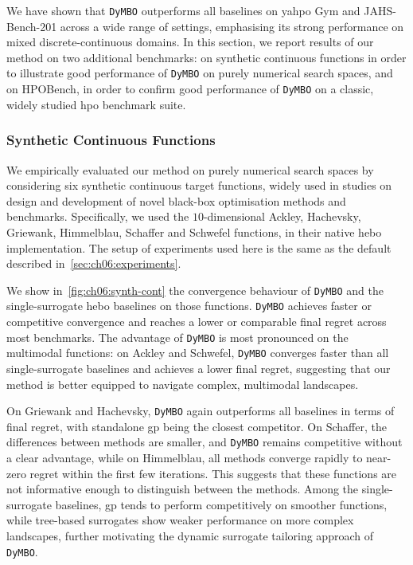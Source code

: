 We have shown that \texttt{DyMBO} outperforms all baselines on \gls{yahpo} Gym and JAHS-Bench-201 across a wide range of settings, emphasising its strong performance on mixed discrete-continuous domains.
In this section, we report results of our method on two additional benchmarks: on synthetic continuous functions in order to illustrate good performance of \texttt{DyMBO} on purely numerical search spaces, and on HPOBench, in order to confirm good performance of \texttt{DyMBO} on a classic, widely studied \gls{hpo} benchmark suite.

\subsubsection{Synthetic Continuous Functions}
\label{sec:ch06:synth-cont-func}

We empirically evaluated our method on purely numerical search spaces by considering six synthetic continuous target functions, widely used in studies on design and development of novel black-box optimisation methods and benchmarks.
Specifically, we used the $10$-dimensional Ackley, Hachevsky, Griewank, Himmelblau, Schaffer and Schwefel functions, in their native \gls{hebo} implementation.
The setup of experiments used here is the same as the default described in~\cref{sec:ch06:experiments}.

We show in~\cref{fig:ch06:synth-cont} the convergence behaviour of \texttt{DyMBO} and the single-surrogate \gls{hebo} baselines on those functions.
\texttt{DyMBO} achieves faster or competitive convergence and reaches a lower or comparable final regret across most benchmarks.
The advantage of \texttt{DyMBO} is most pronounced on the multimodal functions: on Ackley and Schwefel, \texttt{DyMBO} converges faster than all single-surrogate baselines and achieves a lower final regret, suggesting that our method is better equipped to navigate complex, multimodal landscapes.

On Griewank and Hachevsky, \texttt{DyMBO} again outperforms all baselines in terms of final regret, with standalone \gls{gp} being the closest competitor.
On Schaffer, the differences between methods are smaller, and \texttt{DyMBO} remains competitive without a clear advantage, while on Himmelblau, all methods converge rapidly to near-zero regret within the first few iterations.
This suggests that these functions are not informative enough to distinguish between the methods.
Among the single-surrogate baselines, \gls{gp} tends to perform competitively on smoother functions, while tree-based surrogates show weaker performance on more complex landscapes, further motivating the dynamic surrogate tailoring approach of \texttt{DyMBO}.

